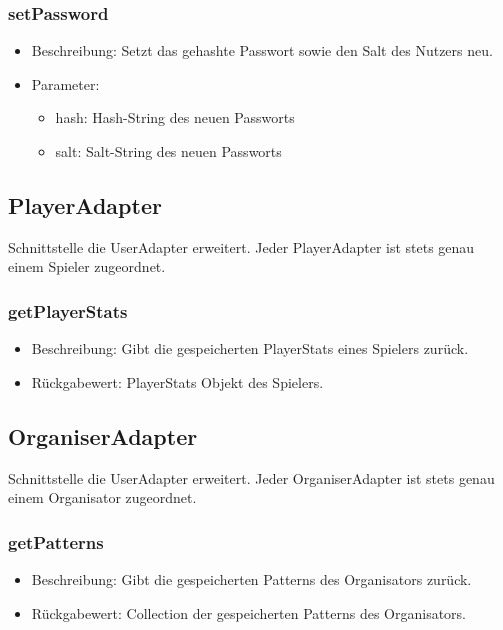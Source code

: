 \documentclass[a4paper]{scrreprt}
\begin{document}
	\subsubsection{setPassword}
	\begin{itemize}
		\item Beschreibung: Setzt das gehashte Passwort sowie den Salt des Nutzers neu.
		\item Parameter:
		\begin{itemize}
			\item hash: Hash-String des neuen Passworts
			\item salt: Salt-String des neuen Passworts
		\end{itemize}
	\end{itemize}
	
	\subsection{PlayerAdapter}
	Schnittstelle die UserAdapter erweitert.
	Jeder PlayerAdapter ist stets genau einem Spieler zugeordnet.
	
	\subsubsection{getPlayerStats}
	\begin{itemize}
		\item Beschreibung: Gibt die gespeicherten PlayerStats eines Spielers zurück.
		\item Rückgabewert: PlayerStats Objekt des Spielers.
	\end{itemize}
	
	\subsection{OrganiserAdapter}
	Schnittstelle die UserAdapter erweitert.
	Jeder OrganiserAdapter ist stets genau einem Organisator zugeordnet.
	
	\subsubsection{getPatterns}
	\begin{itemize}
		\item Beschreibung: Gibt die gespeicherten Patterns des Organisators zurück.
		\item Rückgabewert: Collection der gespeicherten Patterns des Organisators.
	\end{itemize}
	
\end{document}

